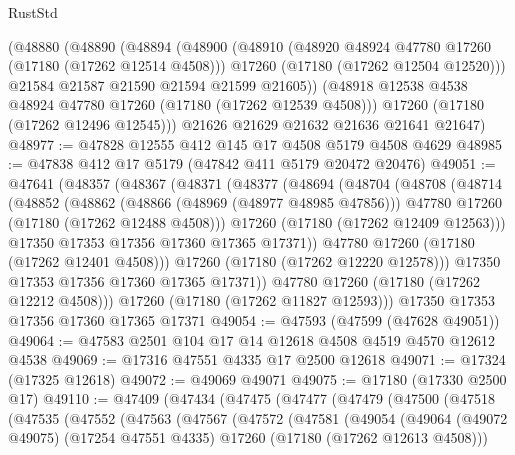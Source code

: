 \begin{lexlean}{RustStd}
\begin{coremodule}
    (@48880
      (@48890
        (@48894
          (@48900
            (@48910
              (@48920 @48924 @47780 @17260 (@17180 (@17262 @12514 @4508)))
              @17260
              (@17180 (@17262 @12504 @12520)))
            @21584
            @21587
            @21590
            @21594
            @21599
            @21605))
        (@48918 @12538 @4538 @48924 @47780 @17260 (@17180 (@17262 @12539 @4508)))
        @17260
        (@17180 (@17262 @12496 @12545)))
      @21626
      @21629
      @21632
      @21636
      @21641
      @21647)
@48977 := @47828 @12555 @412 @145 @17 @4508 @5179 @4508 @4629
@48985 := @47838 @412 @17 @5179 (@47842 @411 @5179 @20472 @20476)
@49051 := @47641
    (@48357
      (@48367
        (@48371
          (@48377
            (@48694
              (@48704
                (@48708
                  (@48714
                    (@48852
                      (@48862
                        (@48866 (@48969 (@48977 @48985 @47856)))
                        @47780
                        @17260
                        (@17180 (@17262 @12488 @4508)))
                      @17260
                      (@17180 (@17262 @12409 @12563)))
                    @17350
                    @17353
                    @17356
                    @17360
                    @17365
                    @17371))
                @47780
                @17260
                (@17180 (@17262 @12401 @4508)))
              @17260
              (@17180 (@17262 @12220 @12578)))
            @17350
            @17353
            @17356
            @17360
            @17365
            @17371))
        @47780
        @17260
        (@17180 (@17262 @12212 @4508)))
      @17260
      (@17180 (@17262 @11827 @12593)))
    @17350
    @17353
    @17356
    @17360
    @17365
    @17371
@49054 := @47593 (@47599 (@47628 @49051))
@49064 := @47583 @2501 @104 @17 @14 @12618 @4508 @4519 @4570 @12612 @4538
@49069 := @17316 @47551 @4335 @17 @2500 @12618
@49071 := @17324 (@17325 @12618)
@49072 := @49069 @49071
@49075 := @17180 (@17330 @2500 @17)
@49110 := @47409
    (@47434
      (@47475
        (@47477
          (@47479
            (@47500
              (@47518
                (@47535
                  (@47552
                    (@47563
                      (@47567
                        (@47572
                          (@47581
                            (@49054
                              (@49064
                                (@49072 @49075)
                                (@17254 @47551 @4335)
                                @17260
                                (@17180 (@17262 @12613 @4508)))

\end{coremodule}
\end{lexlean}
